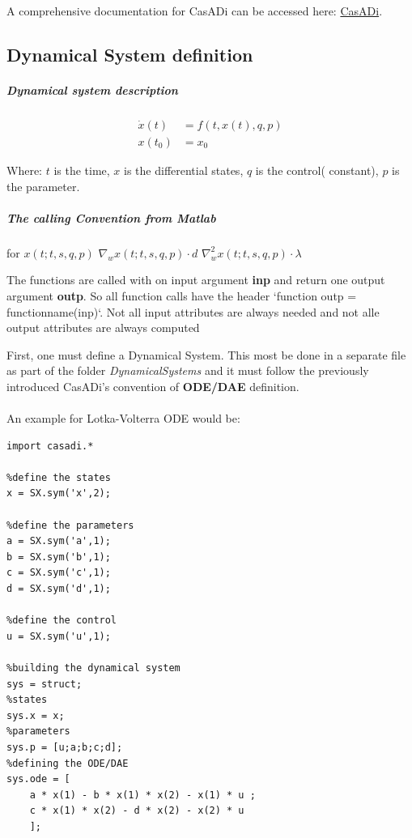 \documentclass[12pt, letterpaper]{article}
\begin{document}
A comprehensive documentation for CasADi can be accessed here: \href{https://web.casadi.org/docs/}{CasADi}.


\subsection{Dynamical System definition}

\subparagraph{Dynamical system description}

\begin{subequations}
\begin{align}
\dot{x}(t) &= f(t, x(t), q, p)   \\
x(t_0) &=x_0
\end{align}
\end{subequations}

Where:
$t$ is the time,
$x$ is the differential states,
$q$ is the control( constant),
$p$ is the parameter.
\\
\subparagraph{The calling Convention from Matlab} for
\boldmath$x(t;t,s,q,p)$   
\boldmath$\nabla_{w} x(t;t,s,q,p)\cdot d$   
\boldmath$\nabla^2_{w} x(t;t,s,q,p) \cdot \lambda$
        

The functions are called with on input argument \textbf{inp} and return one output argument \textbf{outp}. So all function calls have the header `function outp = functionname(inp)`. Not all input attributes are always needed and not alle output attributes are always computed


First, one must define a Dynamical System. This most be done in a separate file as part of the folder  \textit{DynamicalSystems} and it must follow the previously introduced CasADi's convention of \textbf{ODE/DAE} definition. 
\\
\\
An example for Lotka-Volterra ODE would be:

\begin{lstlisting}
import casadi.*

%define the states
x = SX.sym('x',2);

%define the parameters
a = SX.sym('a',1);
b = SX.sym('b',1);
c = SX.sym('c',1);
d = SX.sym('d',1);

%define the control
u = SX.sym('u',1);

%building the dynamical system
sys = struct;
%states
sys.x = x;
%parameters
sys.p = [u;a;b;c;d];
%defining the ODE/DAE
sys.ode = [ 
    a * x(1) - b * x(1) * x(2) - x(1) * u ; 
    c * x(1) * x(2) - d * x(2) - x(2) * u 
    ];
\end{lstlisting}
\end{document}
